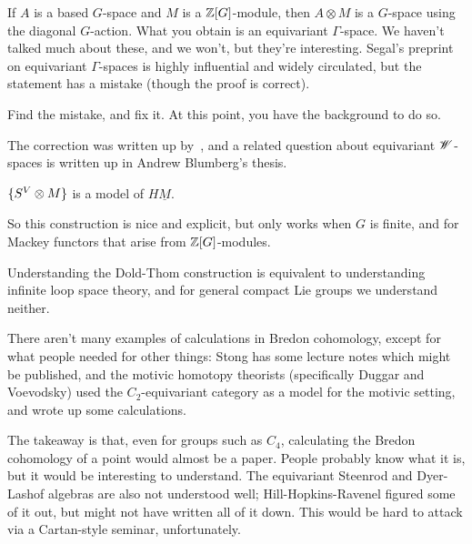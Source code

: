 \begin{cons}
If $A$ is a based $G$-space and $M$ is a $\mathbb Z[G]$-module, then $A\otimes M$ is a $G$-space using the diagonal
$G$-action. What you obtain is an equivariant $\Gamma$-space. We haven't talked much about these, and we won't, but
they're interesting. Segal's preprint on equivariant $\Gamma$-spaces  is highly influential and
widely circulated, but the statement has a mistake (though the proof is correct).
\begin{ex}
Find the mistake, and fix it. At this point, you have the background to do so.
\end{ex}
The correction was written up by~, and a related question about equivariant $\mathscr W$-spaces is
written up in Andrew Blumberg's thesis.
\begin{thm}
$\{S^V\otimes M\}$ is a model of $H\underline M$.
\end{thm}
So this construction is nice and explicit, but only works when $G$ is finite, and for Mackey functors that arise
from $\mathbb Z[G]$-modules.
\end{cons}
Understanding the Dold-Thom construction is equivalent to understanding infinite loop space theory, and for general
compact Lie groups we understand neither.

There aren't many examples of calculations in Bredon cohomology, except for what people needed for other things:
Stong has some lecture notes which might be published, and the motivic homotopy theorists (specifically Duggar and
Voevodsky) used the $C_2$-equivariant category as a model for the motivic setting, and wrote up some calculations.

The takeaway is that, even for groups such as $C_4$, calculating the Bredon cohomology of a point would almost be a
paper. People probably know what it is, but it would be interesting to understand. The equivariant Steenrod and
Dyer-Lashof algebras are also not understood well; Hill-Hopkins-Ravenel figured some of it out, but might not have
written all of it down. This would be hard to attack via a Cartan-style seminar, unfortunately.

